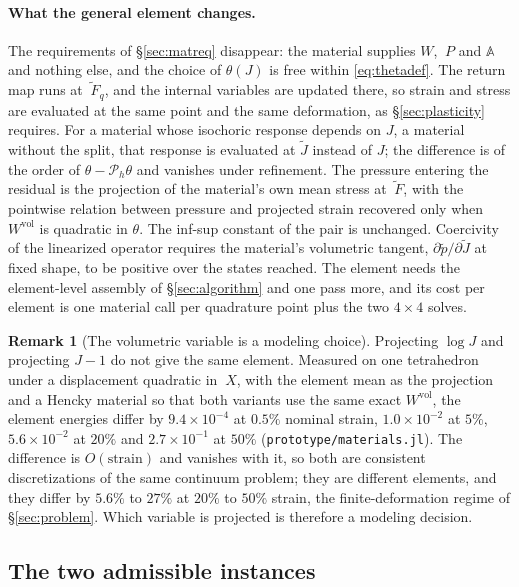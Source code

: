 \documentclass[11pt]{article}
\newcommand{\F}{~F}
\renewcommand{\P}{~P}
\newcommand{\bX}{~X}
\newcommand{\supvol}{^{\mathrm{vol}}}
\newcommand{\code}[1]{\texttt{#1}}
\theoremstyle{definition}
\newtheorem{remark}{Remark}
\theoremstyle{plain}
\begin{document}
\paragraph{What the general element changes.} The requirements of
\S\ref{sec:matreq} disappear: the material supplies $W$, $\P$ and
$\mathbb{A}$ and nothing else, and the choice of $\theta(J)$ is free
within \eqref{eq:thetadef}. The return map runs at $\tilde{\F}_q$, and
the internal variables are updated there, so strain and stress are
evaluated at the same point and the same deformation, as
\S\ref{sec:plasticity} requires. For a material whose isochoric response
depends on $J$, a material without the split, that response is evaluated
at $\tilde J$ instead of $J$; the difference is of the order of $\theta -
\mathcal{P}_h\theta$ and vanishes under refinement. The pressure entering
the residual is the projection of the material's own mean stress at
$\tilde{\F}$, with the pointwise relation between pressure and projected
strain recovered only when $W\supvol$ is quadratic in $\theta$. The
inf-sup constant of the pair is unchanged. Coercivity of the linearized
operator requires the material's volumetric tangent, $\partial\tilde
p/\partial\tilde J$ at fixed shape, to be positive over the states reached.
The element needs the element-level assembly of \S\ref{sec:algorithm} and
one pass more, and its cost per element is one material call per
quadrature point plus the two $4 \times 4$ solves.

\begin{remark}[The volumetric variable is a modeling choice]
\label{rem:thetachoice}
Projecting $\log J$ and projecting $J - 1$ do not give the same element.
Measured on one tetrahedron under a displacement quadratic in $\bX$, with the
element mean as the projection and a Hencky material so that both variants use
the same exact $W\supvol$, the element energies differ by
$9.4\times10^{-4}$ at $0.5\%$ nominal strain,
$1.0\times10^{-2}$ at $5\%$,
$5.6\times10^{-2}$ at $20\%$ and
$2.7\times10^{-1}$ at $50\%$
(\code{prototype/materials.jl}). The difference is $O(\text{strain})$ and
vanishes with it, so both are consistent discretizations of the same continuum
problem; they are different elements, and they differ by $5.6\%$ to $27\%$ at
$20\%$ to $50\%$ strain, the finite-deformation regime of
\S\ref{sec:problem}. Which variable is projected is therefore a modeling
decision.
\end{remark}

\subsection{The two admissible instances}
\label{sec:instances}
\end{document}
